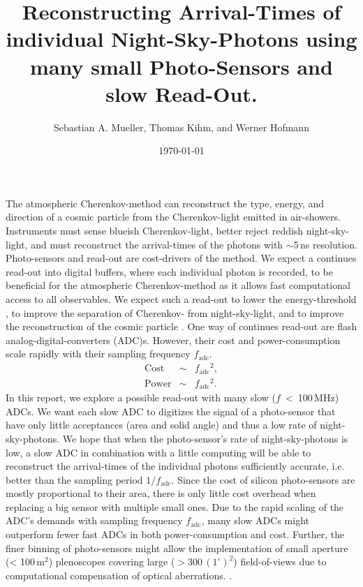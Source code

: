 \documentclass{article}%
\title{
    Reconstructing Arrival-Times of individual Night-Sky-Photons using many small Photo-Sensors and slow Read-Out.
}%
\author{Sebastian A. Mueller, Thomas Kihm, and Werner Hofmann}%
\date{\today{}}%
\begin{document}
%
\maketitle%

\newcommand{\F}{F_\text{nsb}}
\newcommand{\Ftyp}{F_\text{typical}}
\newcommand{\Apulse}{A_\text{pulse}}
\newcommand{\fadc}{f_\text{adc}}
\newcommand{\fproc}{f_\text{proc}}

\begin{multicols}{2}%
%
The atmospheric Cherenkov-method can reconstruct the type, energy, and direction of a cosmic particle from the Cherenkov-light emitted in air-showers.
%
Instruments must sense blueish Cherenkov-light, better reject reddish night-sky-light, and must reconstruct the arrival-times of the photons with $\sim{}$5\,ns resolution.
%
Photo-sensors and read-out are cost-drivers of the method.
\newline
%
We expect a continues read-out into digital buffers, where each individual photon is recorded, to be beneficial for the atmospheric Cherenkov-method as it allows fast computational access to all observables.
%
We expect such a read-out to lower the energy-threshold \cite{jung2005star}, to improve the separation of Cherenkov- from night-sky-light, and to improve the reconstruction of the cosmic particle \cite{catalano2008single}.
\newline
%
One way of continues read-out are flash analog-digital-converters (ADC)s.
%
However, their cost and power-consumption scale rapidly with their sampling frequency $\fadc{}$.
%
\begin{eqnarray*}
\text{Cost} &\sim& \fadc{}^2,\\
\text{Power} &\sim& \fadc{}^2.
\end{eqnarray*}
%
In this report, we explore a possible read-out with many slow \mbox{($f$ < 100\,MHz)} ADCs.
%
We want each slow ADC to digitizes the signal of a photo-sensor that have only little acceptances (area and solid angle) and thus a low rate of night-sky-photons.
%
We hope that when the photo-sensor's rate of night-sky-photons is low, a slow ADC in combination with a little computing will be able to reconstruct the arrival-times of the individual photons sufficiently accurate, i.e. better than the sampling period $1/\fadc{}$.
%
Since the cost of silicon photo-sensors are mostly proportional to their area, there is only little cost overhead when replacing a big sensor with multiple small ones.
%
Due to the rapid scaling of the ADC's demands with sampling frequency $\fadc{}$, many slow ADCs might outperform fewer fast ADCs in both power-consumption and cost.
\newline
Further, the finer binning of photo-sensors might allow the implementation of small aperture (< 100\,m$^2$) plenoscopes covering large ($> 300\,(1^\circ{})^2$) field-of-views due to computational compensation of optical aberrations. \cite{mueller2019phd}.
%

\end{multicols}
\end{document}
